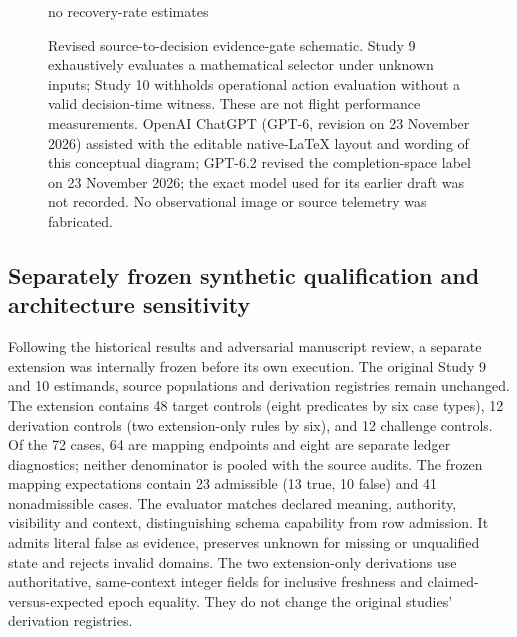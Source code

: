 \documentclass[preprint,12pt]{elsarticle}
\begin{document}
\begin{figure}[H]
\begin{minipage}[t]{0.44\linewidth}
{\begin{minipage}{0.91\linewidth}
no recovery-rate estimates
\end{minipage}}
\end{minipage}
\caption{Revised source-to-decision evidence-gate schematic. Study 9 exhaustively evaluates a mathematical selector under unknown inputs; Study 10 withholds operational action evaluation without a valid decision-time witness. These are not flight performance measurements. OpenAI ChatGPT (GPT-6, revision on 23 November 2026) assisted with the editable native-LaTeX layout and wording of this conceptual diagram; GPT-6.2 revised the completion-space label on 23 November 2026; the exact model used for its earlier draft was not recorded. No observational image or source telemetry was fabricated.}
\label{fig:phase2gates}
\end{figure}

\subsection{Separately frozen synthetic qualification and architecture sensitivity}
\label{sec:extensionmethods}
Following the historical results and adversarial manuscript review, a separate extension was internally frozen before its own execution. The original Study 9 and 10 estimands, source populations and derivation registries remain unchanged. The extension contains 48 target controls (eight predicates by six case types), 12 derivation controls (two extension-only rules by six), and 12 challenge controls. Of the 72 cases, 64 are mapping endpoints and eight are separate ledger diagnostics; neither denominator is pooled with the source audits. The frozen mapping expectations contain 23 admissible (13 true, 10 false) and 41 nonadmissible cases. The evaluator matches declared meaning, authority, visibility and context, distinguishing schema capability from row admission. It admits literal false as evidence, preserves unknown for missing or unqualified state and rejects invalid domains. The two extension-only derivations use authoritative, same-context integer fields for inclusive freshness and claimed-versus-expected epoch equality. They do not change the original studies' derivation registries.
\end{document}
